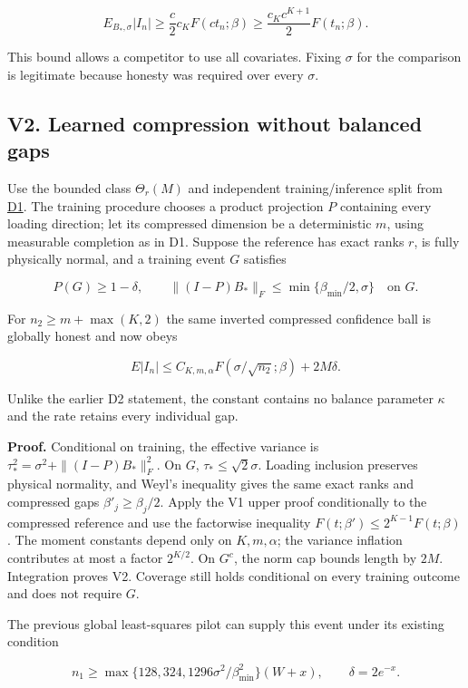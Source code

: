 \documentclass[
  11pt,
]{article}
\begin{document}
\[E_{B_*,\sigma}|I_n|
\ge\frac{c}{2}c_KF(ct_n;\beta)
\ge\frac{c_Kc^{K+1}}2F(t_n;\beta).\]

This bound allows a competitor to use all covariates. Fixing \(\sigma\)
for the comparison is legitimate because honesty was required over every
\(\sigma\).

\subsection{V2. Learned compression without balanced
gaps}\label{v2.-learned-compression-without-balanced-gaps}

Use the bounded class \(\Theta_r(M)\) and independent training/inference
split from \href{../../theory/growing_dimension_general_tt.md}{D1}. The
training procedure chooses a product projection \(P\) containing every
loading direction; let its compressed dimension be a deterministic
\(m\), using measurable completion as in D1. Suppose the reference has
exact ranks \(r\), is fully physically normal, and a training event
\(G\) satisfies

\[P(G)\ge1-\delta,\qquad
\|(I-P)B_*\|_F\le\min\{\beta_{\min}/2,\sigma\}\quad\text{on }G.\]

For \(n_2\ge m+\max(K,2)\) the same inverted compressed confidence ball
is globally honest and now obeys

\[E|I_n|\le C_{K,m,\alpha}
F(\sigma/\sqrt{n_2};\beta)+2M\delta.\tag{V2}\]

Unlike the earlier D2 statement, the constant contains no balance
parameter \(\kappa\) and the rate retains every individual gap.

\textbf{Proof.} Conditional on training, the effective variance is
\(\tau_*^2=\sigma^2+\|(I-P)B_*\|_F^2\). On \(G\),
\(\tau_*\le\sqrt2\sigma\). Loading inclusion preserves physical
normality, and Weyl's inequality gives the same exact ranks and
compressed gaps \(\beta'_j\ge\beta_j/2\). Apply the V1 upper proof
conditionally to the compressed reference and use the factorwise
inequality \(F(t;\beta')\le2^{K-1}F(t;\beta)\). The moment constants
depend only on \(K,m,\alpha\); the variance inflation contributes at
most a factor \(2^{K/2}\). On \(G^c\), the norm cap bounds length by
\(2M\). Integration proves V2. Coverage still holds conditional on every
training outcome and does not require \(G\).

The previous global least-squares pilot can supply this event under its
existing condition

\[n_1\ge\max\{128,324,1296\sigma^2/\beta_{\min}^2\}(W+x),
\qquad\delta=2e^{-x}.\]
\end{document}
